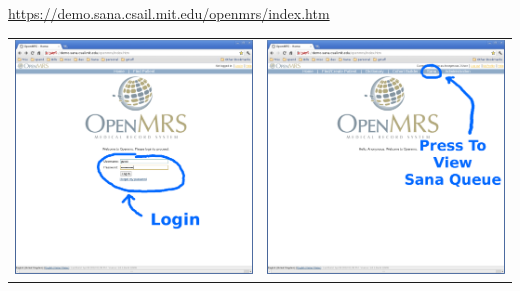 \documentclass[a4paper,10pt]{article}
\begin{document}
\begin{center}
\url{https://demo.sana.csail.mit.edu/openmrs/index.htm}
\end{center}

\begin{flushleft}
\begin{tabular}{ c c }
\includegraphics[scale=0.25,keepaspectratio=true]{openmrs_login.png}
&\includegraphics[scale=0.25,keepaspectratio=true]{openmrs_login_success_sana_tab.png}
\end{tabular}
\end{flushleft}
\end{document}
